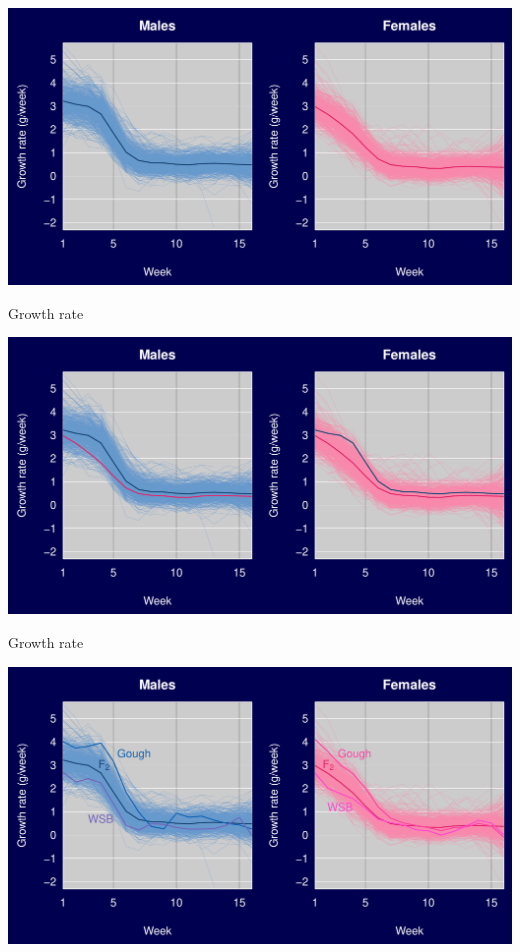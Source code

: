 \documentclass[12pt]{article}
\newcommand{\headsize}{\fontsize{35}{35} \selectfont}
\begin{document}
\vspace{30mm}

\centerline{\includegraphics{Figs/rate1.pdf}}


\newpage

\addtocounter{page}{-1}

\headsize \color{myyellow}
\hfill \begin{minipage}{5.75in}
\centering
Growth rate
\end{minipage}

\vspace{30mm}

\centerline{\includegraphics{Figs/rate2.pdf}}


\newpage

\addtocounter{page}{-1}

\headsize \color{myyellow}
\hfill \begin{minipage}{5.75in}
\centering
Growth rate
\end{minipage}

\vspace{30mm}

\centerline{\includegraphics{Figs/rate3.pdf}}
\end{document}
